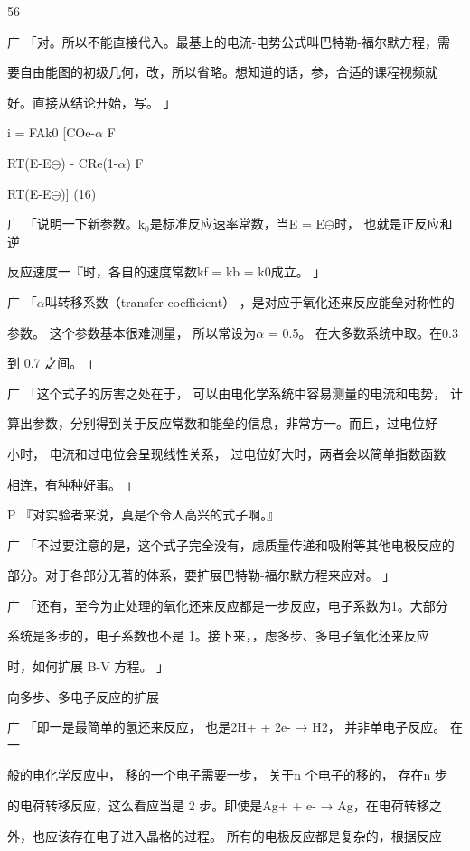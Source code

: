 56\par
广 「对。所以不能直接代入。最基上的电流-电势公式叫巴特勒-福尔默方程，需\par
要自由能图的初级几何，改，所以省略。想知道的话，参，合适的课程视频就\par
好。直接从结论开始，写。 」\par
i = FAk0 [COe-$\alpha$ F\par
RT(E-E$\ominus$) - CRe(1-$\alpha$) F\par
RT(E-E$\ominus$)] (16)\par
广 「说明一下新参数。k$_{0}$是标准反应速率常数，当E = E$\ominus$时， 也就是正反应和逆\par
反应速度一『时，各自的速度常数kf = kb = k0成立。 」\par
广 「$\alpha$叫转移系数（transfer coefficient） ，是对应于氧化还来反应能垒对称性的\par
参数。 这个参数基本很难测量， 所以常设为$\alpha$ = 0.5。 在大多数系统中取。在0.3\par
到 0.7 之间。 」\par
广 「这个式子的厉害之处在于， 可以由电化学系统中容易测量的电流和电势， 计\par
算出参数，分别得到关于反应常数和能垒的信息，非常方一。而且，过电位好\par
小时， 电流和过电位会呈现线性关系， 过电位好大时，两者会以简单指数函数\par
相连，有种种好事。 」\par
P 『对实验者来说，真是个令人高兴的式子啊。』\par
广 「不过要注意的是，这个式子完全没有，虑质量传递和吸附等其他电极反应的\par
部分。对于各部分无著的体系，要扩展巴特勒-福尔默方程来应对。 」\par
广 「还有，至今为止处理的氧化还来反应都是一步反应，电子系数为1。大部分\par
系统是多步的，电子系数也不是 1。接下来，，虑多步、多电子氧化还来反应\par
时，如何扩展 B-V 方程。 」\par
向多步、多电子反应的扩展\par
广 「即一是最简单的氢还来反应， 也是2H+ + 2e- → H2， 并非单电子反应。 在一\par
般的电化学反应中， 移的一个电子需要一步， 关于n 个电子的移的， 存在n 步\par
的电荷转移反应，这么看应当是 2 步。即使是Ag+ + e- → Ag，在电荷转移之\par
外，也应该存在电子进入晶格的过程。 所有的电极反应都是复杂的，根据反应\par

